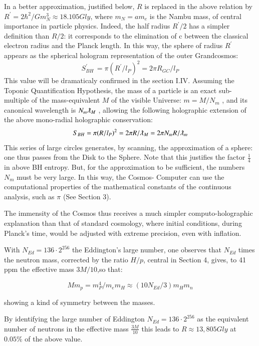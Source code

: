 \documentclass[twoside,draft]{article}
\begin{document}
\begin{sloppypar}
{In a better approximation, justified below, $R$ is replaced in the above relation by $R^{\prime} = 2\hbar^{2}/Gm_{N}^{3}
\approx 18.105 Gly$, where $m_{N} = am_{e}$ is the Nambu mass, of central importance in particle
physics. Indeed, the half radius $R^{\prime}/2$ has a simpler definition than $R/2$: it corresponds to the
elimination of c between the classical electron radius and the Planck length. In this way, the sphere
of radius $R^{\prime}$ appears as the spherical hologram representation of the outer Grandcosmos:
\begin{equation}
S^{\prime}_{BH}\, = \pi(R^{\prime}/l_{P})^{2} = 2\pi R_{GC} /l_{P}
\end{equation}
This value will be dramaticaly confirmed in the section I.IV.
Assuming the Toponic Quantification Hypothesis, the mass of a particle is an exact sub-multiple
of the mass-equivalent $M$ of the visible Universe: $m = M/N_{m}$ , and its canonical wavelength is $N_m \lambdabar_{M}$ ,
allowing the following holographic extension of the above mono-radial holographic conservation:
\begin{equation}
S_{BH} = \pi(R/l_{P})^{2} = 2\pi R/\lambdabar_{M} = 2\pi N_{m} R/\lambdabar_{m}
\end{equation}
This series of large circles generates, by scanning, the approximation of a sphere: one thus passes
from the Disk to the Sphere. Note that this justifies the factor $\frac{1}{4}$ in above BH entropy. But, for
the approximation to be sufficient, the numbers $N_{m}$ must be very large. In this way, the Cosmos-
Computer can use the computational properties of the mathematical constants of the continuous
analysis, such as $\pi$ (See Section 3).

The immensity of the Cosmos thus receives a much simpler computo-holographic explanation than
that of standard cosmology, where initial conditions, during Planck's time, would be adjusted with
extreme precision, even with inflation. 

With $N_{Ed} = 136 \cdot2^{256}$ the Eddington's large number, one observes that $N_{Ed}$ times the neutron mass, corrected by the ratio $H/p$, central in Section 4, gives, to 41 ppm the effective mass $3M/10$,so that:

\begin{equation}
Mm_p = m_P^4/m_em_H\approx(10N_{Ed}/3)m_Hm_n 
\end{equation}

showing a kind of symmetry between the masses.

By identifying the large number of Eddington $N_{Ed} = 136 \cdot
2^{256}$ as the equivalent number of neutrons in the effective mass $\frac{3M}{10}$ this leads to $R \approx 13,805 
Gly$ at $0.05\%$ of the above value.


}
\end{sloppypar}
\end{document}

